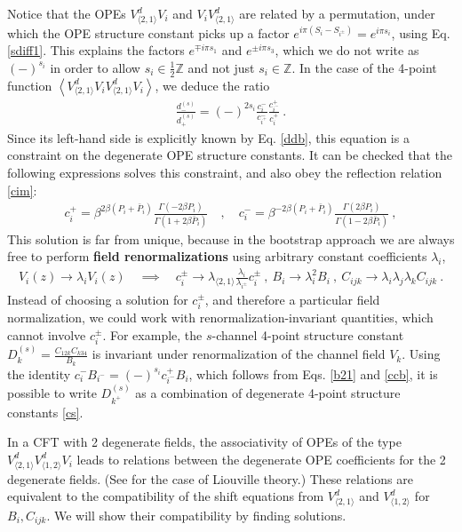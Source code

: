 \documentclass[12pt, a4paper]{article}
\newcommand{\myindex}[1]{\textbf{\boldmath #1}}
\begin{document}
Notice that the OPEs $V^d_{\langle 2,1\rangle}V_i$ and $V_iV^d_{\langle 2,1\rangle}$ are related by a permutation, under which the OPE structure constant picks up a factor $e^{i\pi(S_i-S_{i^\pm})} = e^{i\pi s_i}$, using Eq. \eqref{sdiff1}. 
This explains the factors $e^{\mp i\pi s_1}$ and $e^{\pm i\pi s_3}$, which we do not write as $(-)^{s_i}$ in order to allow $s_i\in\frac12\mathbb{Z}$ and not just $s_i\in \mathbb{Z}$.
In the case of the 4-point function $\left<V_{\langle 2,1\rangle}^d V_iV_{\langle 2,1\rangle}^d V_i\right>$, we deduce the ratio 
\begin{align}
 \frac{d^{(s)}_-}{d^{(s)}_+}= (-)^{2s_i}\frac{c_i^-}{c_{i^+}^-} \frac{c_{i^-}^+}{c_i^+}\ .
 \label{ddcccc}
\end{align}
Since its left-hand side is explicitly known by Eq. \eqref{ddb}, this equation is a constraint on the degenerate OPE structure constants.
It can be checked that the following expressions solves this constraint, and also obey the reflection relation \eqref{cim}: 
\begin{align}
 c^+_i = \beta^{2\beta(P_i+\bar P_i)} \frac{\Gamma(-2\beta P_i)}{\Gamma(1+2\beta \bar P_i)} \quad , \quad c^-_i = \beta^{-2\beta(P_i+\bar P_i)} \frac{\Gamma(2\beta P_i)}{\Gamma(1-2\beta \bar P_i)}\ ,
 \label{cpcm}
\end{align}
This solution is far from unique, because in the bootstrap approach we are always free to perform \myindex{field renormalizations} using arbitrary constant coefficients $\lambda_i$,
\begin{align}
 V_i(z) \to \lambda_i V_i(z)\quad \implies \quad c_i^\pm \to \lambda_{\langle 2,1\rangle}\frac{\lambda_i}{\lambda_{i^\pm}}c_i^\pm \ , \  B_i \to \lambda_i^2B_i \ , \ C_{ijk}\to \lambda_i\lambda_j\lambda_k C_{ijk}\ .
 \label{vlv}
\end{align}
Instead of choosing a solution for $c_i^\pm$, and therefore a particular field normalization, 
we could work with renormalization-invariant quantities, which cannot involve $c_i^\pm$. For example, the $s$-channel 4-point structure constant $D^{(s)}_k = \frac{C_{12k}C_{k34}}{B_k}$ is invariant under renormalization of the channel field $V_k$. Using the identity $c_i^- B_{i^-} = (-)^{s_i} c^+_{i^-} B_i$, which follows from Eqs. \eqref{b21} and \eqref{ccb}, it is possible to write $D^{(s)}_{k^+}$ as a combination of degenerate 4-point structure constants \eqref{cs}. 

In a CFT with 2 degenerate fields, the associativity of OPEs of the type 
$V^d_{\langle 2,1\rangle}V^d_{\langle 1,2\rangle}V_i$ leads to relations between 
the degenerate OPE coefficients for the 2 degenerate fields. (See \cite[Exercise 3.2]{rib14} for the case of Liouville theory.) These relations are equivalent to the compatibility of the shift equations from $V^d_{\langle 2,1\rangle}$ and $V^d_{\langle 1,2\rangle}$ for $B_i,C_{ijk}$. We will show their compatibility by finding solutions. 
\end{document}
